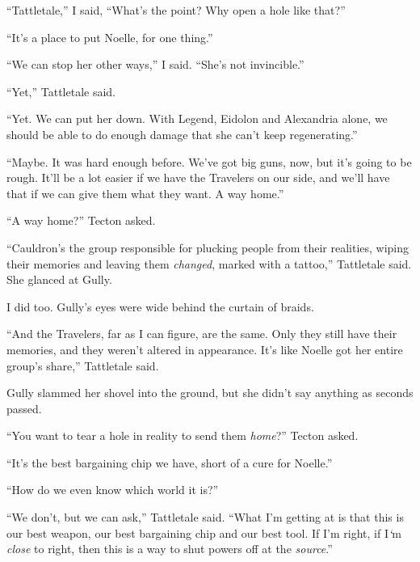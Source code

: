 ``Tattletale,'' I said, ``What's the point?  Why open a hole like that?''



``It's a place to put Noelle, for one thing.''



``We can stop her other ways,'' I said.  ``She's not invincible.''



``Yet,'' Tattletale said.



``Yet.  We can put her down.  With Legend, Eidolon and Alexandria alone, we should be able to do enough damage that she can't keep regenerating.''



``Maybe.  It was hard enough before.  We've got big guns, now, but it's going to be rough.  It'll be a lot easier if we have the Travelers on our side, and we'll have that if we can give them what they want.  A way home.''



``A way home?'' Tecton asked.



``Cauldron's the group responsible for plucking people from their realities, wiping their memories and leaving them \emph{changed}, marked with a tattoo,'' Tattletale said.  She glanced at Gully.



I did too.  Gully's eyes were wide behind the curtain of braids.



``And the Travelers, far as I can figure, are the same.  Only they still have their memories, and they weren't altered in appearance.  It's like Noelle got her entire group's share,'' Tattletale said.



Gully slammed her shovel into the ground, but she didn't say anything as seconds passed.



``You want to tear a hole in reality to send them \emph{home}?'' Tecton asked.



``It's the best bargaining chip we have, short of a cure for Noelle.''



``How do we even know which world it is?''



``We don't, but we can ask,'' Tattletale said.  ``What I'm getting at is that this is our best weapon, our best bargaining chip and our best tool.  If I'm right, if I\emph{`}m \emph{close} to right, then this is a way to shut powers off at the \emph{source}.''




